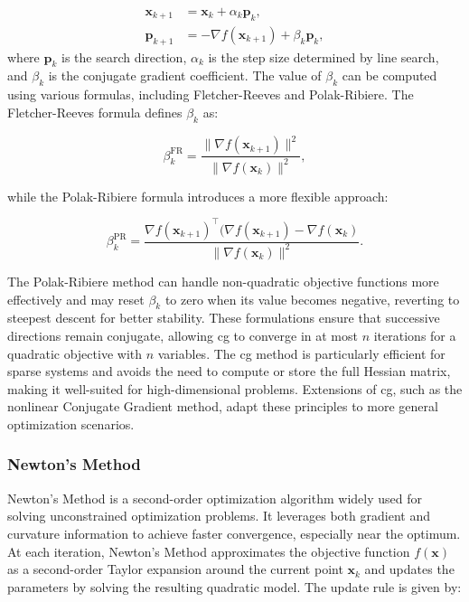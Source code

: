 \begin{align}
\mathbf{x}_{k+1} &= \mathbf{x}_k + \alpha_k \mathbf{p}_k, \\
\mathbf{p}_{k+1} &= -\nabla f(\mathbf{x}_{k+1}) + \beta_k \mathbf{p}_k,
\end{align}
where $\mathbf{p}_k$ is the search direction, $\alpha_k$ is the step size determined by line search, and $\beta_k$ is the conjugate gradient coefficient. The value of $\beta_k$ can be computed using various formulas, including Fletcher-Reeves and Polak-Ribiere. The Fletcher-Reeves formula defines $\beta_k$ as:

\begin{equation}
\beta_k^{\text{FR}} = \frac{\|\nabla f(\mathbf{x}_{k+1})\|^2}{\|\nabla f(\mathbf{x}_k)\|^2},
\end{equation}

\noindent while the Polak-Ribiere formula introduces a more flexible approach:

\begin{equation}
\beta_k^{\text{PR}} = \frac{\nabla f(\mathbf{x}_{k+1})^\top (\nabla f(\mathbf{x}_{k+1}) - \nabla f(\mathbf{x}_k)}{\|\nabla f(\mathbf{x}_k)\|^2}.
\end{equation}

\noindent The Polak-Ribiere method can handle non-quadratic objective functions more effectively and may reset $\beta_k$ to zero when its value becomes negative, reverting to steepest descent for better stability. These formulations ensure that successive directions remain conjugate, allowing \ac{cg} to converge in at most $n$ iterations for a quadratic objective with $n$ variables. The \ac{cg} method is particularly efficient for sparse systems and avoids the need to compute or store the full Hessian matrix, making it well-suited for high-dimensional problems. Extensions of \ac{cg}, such as the nonlinear Conjugate Gradient method, adapt these principles to more general optimization scenarios.

\subsubsection{Newton's Method}
\label{subsubsection:newtons_method}
Newton's Method is a second-order optimization algorithm widely used for solving unconstrained optimization problems. It leverages both gradient and curvature information to achieve faster convergence, especially near the optimum. At each iteration, Newton's Method approximates the objective function $f(\mathbf{x})$ as a second-order Taylor expansion around the current point $\mathbf{x}_k$ and updates the parameters by solving the resulting quadratic model. The update rule is given by:

